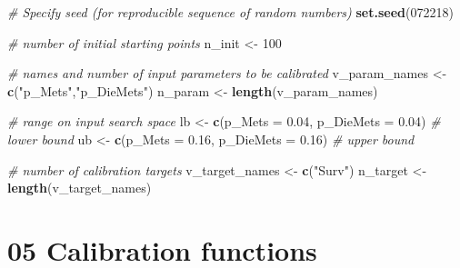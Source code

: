 \documentclass[
]{article}
\newenvironment{Shaded}{\begin{snugshade}}{\end{snugshade}}
\newcommand{\CommentTok}[1]{\textcolor[rgb]{0.56,0.35,0.01}{\textit{#1}}}
\newcommand{\DataTypeTok}[1]{\textcolor[rgb]{0.13,0.29,0.53}{#1}}
\newcommand{\DecValTok}[1]{\textcolor[rgb]{0.00,0.00,0.81}{#1}}
\newcommand{\FloatTok}[1]{\textcolor[rgb]{0.00,0.00,0.81}{#1}}
\newcommand{\KeywordTok}[1]{\textcolor[rgb]{0.13,0.29,0.53}{\textbf{#1}}}
\newcommand{\NormalTok}[1]{#1}
\newcommand{\StringTok}[1]{\textcolor[rgb]{0.31,0.60,0.02}{#1}}
\begin{document}
\begin{Shaded}
\begin{Highlighting}[]
\CommentTok{# Specify seed (for reproducible sequence of random numbers)}
\KeywordTok{set.seed}\NormalTok{(}\DecValTok{072218}\NormalTok{)}

\CommentTok{# number of initial starting points}
\NormalTok{n_init <-}\StringTok{ }\DecValTok{100}

\CommentTok{# names and number of input parameters to be calibrated}
\NormalTok{v_param_names <-}\StringTok{ }\KeywordTok{c}\NormalTok{(}\StringTok{"p_Mets"}\NormalTok{,}\StringTok{"p_DieMets"}\NormalTok{)}
\NormalTok{n_param <-}\StringTok{ }\KeywordTok{length}\NormalTok{(v_param_names)}

\CommentTok{# range on input search space}
\NormalTok{lb <-}\StringTok{ }\KeywordTok{c}\NormalTok{(}\DataTypeTok{p_Mets =} \FloatTok{0.04}\NormalTok{, }\DataTypeTok{p_DieMets =} \FloatTok{0.04}\NormalTok{) }\CommentTok{# lower bound}
\NormalTok{ub <-}\StringTok{ }\KeywordTok{c}\NormalTok{(}\DataTypeTok{p_Mets =} \FloatTok{0.16}\NormalTok{, }\DataTypeTok{p_DieMets =} \FloatTok{0.16}\NormalTok{) }\CommentTok{# upper bound}

\CommentTok{# number of calibration targets}
\NormalTok{v_target_names <-}\StringTok{ }\KeywordTok{c}\NormalTok{(}\StringTok{"Surv"}\NormalTok{)}
\NormalTok{n_target <-}\StringTok{ }\KeywordTok{length}\NormalTok{(v_target_names)}
\end{Highlighting}
\end{Shaded}

\hypertarget{calibration-functions}{%
\section{05 Calibration functions}\label{calibration-functions}}
\end{document}
